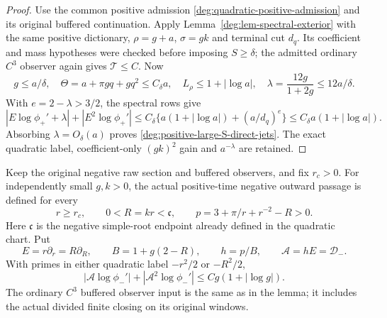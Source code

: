 \begin{proof}
Use the common positive admission \eqref{deg:quadratic-positive-admission}
and its original buffered continuation. Apply
Lemma~\ref{deg:lem-spectral-exterior} with the same positive dictionary,
\(\rho=g+a\), \(\sigma=gk\) and terminal cut \(d_q\).
Its coefficient and mass hypotheses were checked before imposing
\(S\ge\delta\); the admitted ordinary \(C^3\) observer again gives
\(\mathcal T\le C\). Now
\[
 g\le a/\delta,\quad
 \Theta=a+\pi gq+gq^2\le C_\delta a,\quad
 L_\rho\le1+|\log a|,\quad
 \lambda=\frac{12g}{1+2g}\le12a/\delta.
\]
With \(e=2-\lambda>3/2\), the spectral rows give
\[
 |E\log\phi_+'+\lambda|+|E^2\log\phi_+'|
 \le C_\delta\{a(1+|\log a|)+(a/d_q)^e\}
 \le C_\delta a(1+|\log a|).
\]
Absorbing \(\lambda=O_\delta(a)\) proves
\eqref{deg:positive-large-S-direct-jets}. The exact quadratic label,
coefficient-only \((gk)^2\) gain and \(a^{-\lambda}\) are retained.
\end{proof}


\begin{corollary}\label{deg:cor-negative-absolute-outer}
Keep the original negative raw section and buffered observers, and fix
\(r_c>0\). For independently small \(g,k>0\), the actual positive-time
negative outward passage is defined for every
\[
 r\ge r_c,\qquad 0<R=kr<\mathfrak c,
 \qquad p=3+\pi/r+r^{-2}-R>0.
\]
Here \(\mathfrak c\) is the negative simple-root endpoint already defined
in the quadratic chart. Put
\[
 E=r\partial_r=R\partial_R,\qquad B=1+g(2-R),\qquad
 h=p/B,\qquad \mathcal A=hE=\mathcal D_-.
\]
With primes in either quadratic label \(-r^2/2\) or \(-R^2/2\),
\begin{equation}\label{deg:negative-absolute-direct-jets}
 |\mathcal A\log\phi_-'|+|\mathcal A^2\log\phi_-'|
 \le Cg(1+|\log g|).
\end{equation}
The ordinary \(C^3\) buffered observer input is the same as in the lemma;
it includes the actual divided finite closing on its original windows.
\end{corollary}

